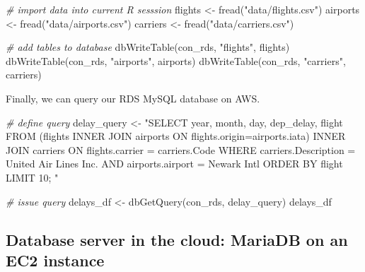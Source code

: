 \documentclass[
  12pt,
]{style/krantz}
\newenvironment{Shaded}{\begin{snugshade}}{\end{snugshade}}
\newcommand{\CommentTok}[1]{\textcolor[rgb]{0.56,0.35,0.01}{\textit{#1}}}
\newcommand{\FunctionTok}[1]{\textcolor[rgb]{0.00,0.00,0.00}{#1}}
\newcommand{\NormalTok}[1]{#1}
\newcommand{\OtherTok}[1]{\textcolor[rgb]{0.56,0.35,0.01}{#1}}
\newcommand{\StringTok}[1]{\textcolor[rgb]{0.31,0.60,0.02}{#1}}
\begin{document}
\begin{Shaded}
\begin{Highlighting}[]
\CommentTok{\# import data into current R sesssion}
\NormalTok{flights }\OtherTok{\textless{}{-}} \FunctionTok{fread}\NormalTok{(}\StringTok{"data/flights.csv"}\NormalTok{)}
\NormalTok{airports }\OtherTok{\textless{}{-}} \FunctionTok{fread}\NormalTok{(}\StringTok{"data/airports.csv"}\NormalTok{)}
\NormalTok{carriers }\OtherTok{\textless{}{-}} \FunctionTok{fread}\NormalTok{(}\StringTok{"data/carriers.csv"}\NormalTok{)}

\CommentTok{\# add tables to database}
\FunctionTok{dbWriteTable}\NormalTok{(con\_rds, }\StringTok{"flights"}\NormalTok{, flights)}
\FunctionTok{dbWriteTable}\NormalTok{(con\_rds, }\StringTok{"airports"}\NormalTok{, airports)}
\FunctionTok{dbWriteTable}\NormalTok{(con\_rds, }\StringTok{"carriers"}\NormalTok{, carriers)}
\end{Highlighting}
\end{Shaded}

Finally, we can query our RDS MySQL database on AWS.

\begin{Shaded}
\begin{Highlighting}[]
\CommentTok{\# define query}
\NormalTok{delay\_query }\OtherTok{\textless{}{-}}
\StringTok{"SELECT }
\StringTok{year,}
\StringTok{month, }
\StringTok{day,}
\StringTok{dep\_delay,}
\StringTok{flight}
\StringTok{FROM (flights INNER JOIN airports ON flights.origin=airports.iata) }
\StringTok{INNER JOIN carriers ON flights.carrier = carriers.Code}
\StringTok{WHERE carriers.Description = \textquotesingle{}United Air Lines Inc.\textquotesingle{}}
\StringTok{AND airports.airport = \textquotesingle{}Newark Intl\textquotesingle{}}
\StringTok{ORDER BY flight}
\StringTok{LIMIT 10;}
\StringTok{"}

\CommentTok{\# issue query}
\NormalTok{delays\_df }\OtherTok{\textless{}{-}} \FunctionTok{dbGetQuery}\NormalTok{(con\_rds, delay\_query)}
\NormalTok{delays\_df}
\end{Highlighting}
\end{Shaded}

\hypertarget{database-server-in-the-cloud-mariadb-on-an-ec2-instance}{%
\subsection{Database server in the cloud: MariaDB on an EC2 instance}\label{database-server-in-the-cloud-mariadb-on-an-ec2-instance}}
\end{document}
